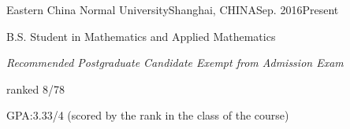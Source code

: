 
\begin{eduitem}{Eastern China Normal University}{Shanghai, CHINA}{Sep. 2016}{Present}
\item B.S. Student in Mathematics and Applied Mathematics
\item {\emph{Recommended Postgraduate Candidate Exempt from Admission Exam}}
\item ranked 8/78
\item GPA:3.33/4 (scored by the rank in the class of the course)
\end{eduitem}



\endinput